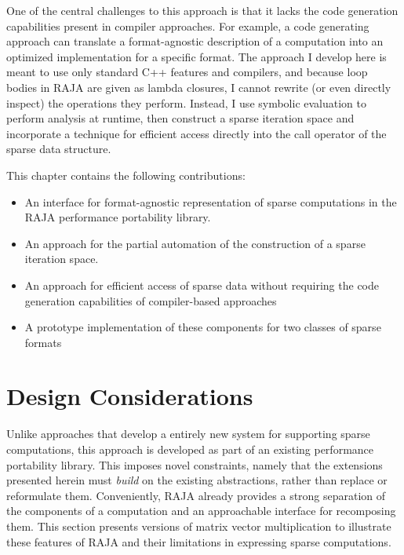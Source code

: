 One of the central challenges to this approach is that it lacks the code generation capabilities present in compiler approaches.
For example, a code generating approach can translate a format-agnostic description of a computation into an optimized implementation for a specific format.
The approach I develop here is meant to use only standard C++ features and compilers, and because loop bodies in RAJA are given as lambda closures, I cannot rewrite (or even directly inspect) the operations they perform.
Instead, I use symbolic evaluation to perform analysis at runtime, then construct a sparse iteration space and incorporate a technique for efficient access directly into the call operator of the sparse data structure.

This chapter contains the following contributions:
\begin{itemize}
\item An interface for format-agnostic representation of sparse computations in the RAJA performance portability library.
\item An approach for the partial automation of the construction of a sparse iteration space.
\item An approach for efficient access of sparse data without requiring the code generation capabilities of compiler-based approaches
\item A prototype implementation of these components for two classes of sparse formats
\end{itemize}


\section{Design Considerations}
Unlike approaches that develop a entirely new system for supporting sparse computations, this approach is developed as part of an existing performance portability library.
This imposes novel constraints, namely that the extensions presented herein must \textit{build} on the existing abstractions, rather than replace or reformulate them.
Conveniently, RAJA already provides a strong separation of the components of a computation and an approachable interface for recomposing them.
This section presents versions of matrix vector multiplication to illustrate these features of RAJA and their limitations in expressing sparse computations.


